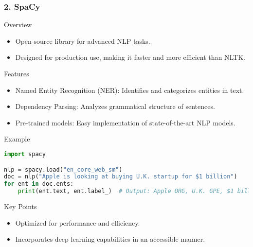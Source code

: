 \documentclass[aspectratio=169]{beamer}
\begin{document}
\begin{frame}[fragile]
    \frametitle{2. SpaCy}
    \begin{block}{Overview}
        \begin{itemize}
            \item Open-source library for advanced NLP tasks.
            \item Designed for production use, making it faster and more efficient than NLTK.
        \end{itemize}
    \end{block}

    \begin{block}{Features}
        \begin{itemize}
            \item Named Entity Recognition (NER): Identifies and categorizes entities in text.
            \item Dependency Parsing: Analyzes grammatical structure of sentences.
            \item Pre-trained models: Easy implementation of state-of-the-art NLP models.
        \end{itemize}
    \end{block}

    \begin{block}{Example}
        \begin{lstlisting}[language=Python]
import spacy

nlp = spacy.load("en_core_web_sm")
doc = nlp("Apple is looking at buying U.K. startup for $1 billion")
for ent in doc.ents:
    print(ent.text, ent.label_)  # Output: Apple ORG, U.K. GPE, $1 billion MONEY
        \end{lstlisting}
    \end{block}

    \begin{block}{Key Points}
        \begin{itemize}
            \item Optimized for performance and efficiency.
            \item Incorporates deep learning capabilities in an accessible manner.
        \end{itemize}
    \end{block}
\end{frame}
\end{document}
